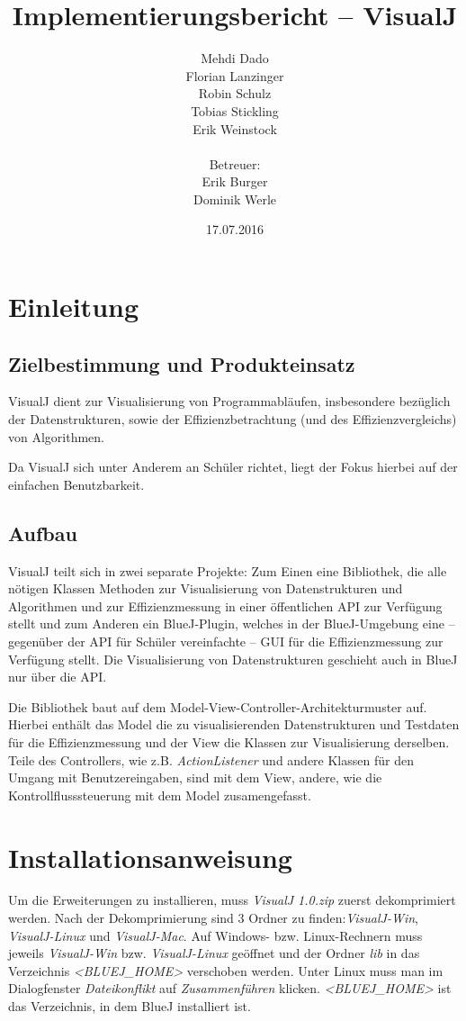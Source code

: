 \documentclass[a4paper]{report}
\title{Implementierungsbericht -- VisualJ}
\author{Mehdi Dado\\Florian Lanzinger\\Robin Schulz\\Tobias Stickling\\Erik Weinstock\\ \\
Betreuer:\\Erik Burger\\Dominik Werle}
\date{17.07.2016}
\begin{document}
\dominitoc

\maketitle
\setcounter{tocdepth}{1}
\tableofcontents
\newpage

\chapter{Einleitung}

\section{Zielbestimmung und Produkteinsatz}

VisualJ dient zur Visualisierung von Programmabläufen, insbesondere bezüglich der Datenstrukturen, sowie der Effizienzbetrachtung (und des Effizienzvergleichs) von Algorithmen. 

Da VisualJ sich unter Anderem an Schüler richtet, liegt der Fokus hierbei auf der einfachen Benutzbarkeit.

\section{Aufbau}

VisualJ teilt sich in zwei separate Projekte: Zum Einen eine Bibliothek, die alle nötigen Klassen Methoden zur Visualisierung von Datenstrukturen und Algorithmen und zur Effizienzmessung in einer öffentlichen API zur Verfügung stellt und zum Anderen ein BlueJ-Plugin, welches in der BlueJ-Umgebung eine -- gegenüber der API für Schüler vereinfachte -- GUI für die Effizienzmessung zur Verfügung stellt. Die Visualisierung von Datenstrukturen geschieht auch in BlueJ nur über die API.

Die Bibliothek baut auf dem Model-View-Controller-Architekturmuster auf. Hierbei enthält das Model die zu visualisierenden Datenstrukturen und Testdaten für die Effizienzmessung und der View die Klassen zur Visualisierung derselben. Teile des Controllers, wie z.B. \emph{ActionListener} und andere Klassen für den Umgang mit Benutzereingaben, sind mit dem View, andere, wie die Kontrollflusssteuerung mit dem Model zusamengefasst.

\chapter{Installationsanweisung}
Um die Erweiterungen zu installieren, muss \emph{VisualJ 1.0.zip} zuerst dekomprimiert werden. Nach der Dekomprimierung sind 3 Ordner zu finden:\emph{VisualJ-Win}, \emph{VisualJ-Linux} und \emph{VisualJ-Mac}. Auf Windows- bzw. Linux-Rechnern muss jeweils \emph{VisualJ-Win} bzw. \emph{VisualJ-Linux} geöffnet und der Ordner \emph{lib} in das Verzeichnis \emph{<BLUEJ\_HOME>} verschoben werden. Unter Linux muss man im Dialogfenster \emph{Dateikonflikt} auf \emph{Zusammenführen} klicken. \emph{<BLUEJ\_HOME>} ist das Verzeichnis, in dem BlueJ installiert ist.
\end{document}
